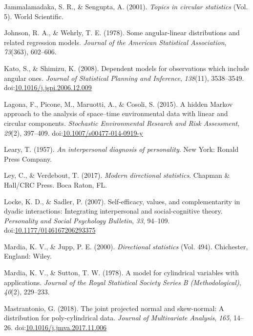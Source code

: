 \documentclass[man,mask]{apa6}
\begin{document}
\leavevmode\hypertarget{ref-jammalamadaka2001topics}{}%
Jammalamadaka, S. R., \& Sengupta, A. (2001). \emph{Topics in circular statistics} (Vol. 5). World Scientific.

\leavevmode\hypertarget{ref-johnson1978some}{}%
Johnson, R. A., \& Wehrly, T. E. (1978). Some angular-linear distributions and related regression models. \emph{Journal of the American Statistical Association}, \emph{73}(363), 602--606.

\leavevmode\hypertarget{ref-kato2008dependent}{}%
Kato, S., \& Shimizu, K. (2008). Dependent models for observations which include angular ones. \emph{Journal of Statistical Planning and Inference}, \emph{138}(11), 3538--3549. doi:\href{https://doi.org/10.1016/j.jspi.2006.12.009}{10.1016/j.jspi.2006.12.009}

\leavevmode\hypertarget{ref-lagona2015hidden}{}%
Lagona, F., Picone, M., Maruotti, A., \& Cosoli, S. (2015). A hidden Markov approach to the analysis of space--time environmental data with linear and circular components. \emph{Stochastic Environmental Research and Risk Assessment}, \emph{29}(2), 397--409. doi:\href{https://doi.org/10.1007/s00477-014-0919-y}{10.1007/s00477-014-0919-y}

\leavevmode\hypertarget{ref-leary1957}{}%
Leary, T. (1957). \emph{An interpersonal diagnosis of personality}. New York: Ronald Press Company.

\leavevmode\hypertarget{ref-ley2017modern}{}%
Ley, C., \& Verdebout, T. (2017). \emph{Modern directional statistics}. Chapman \& Hall/CRC Press. Boca Raton, FL.

\leavevmode\hypertarget{ref-locke2007selfefficacy}{}%
Locke, K. D., \& Sadler, P. (2007). Self-efficacy, values, and complementarity in dyadic interactions: Integrating interpersonal and social-cognitive theory. \emph{Personality and Social Psychology Bulletin}, \emph{33}, 94--109. doi:\href{https://doi.org/10.1177/0146167206293375}{10.1177/0146167206293375}

\leavevmode\hypertarget{ref-mardia2000directional}{}%
Mardia, K. V., \& Jupp, P. E. (2000). \emph{Directional statistics} (Vol. 494). Chichester, England: Wiley.

\leavevmode\hypertarget{ref-mardia1978model}{}%
Mardia, K. V., \& Sutton, T. W. (1978). A model for cylindrical variables with applications. \emph{Journal of the Royal Statistical Society Series B (Methodological)}, \emph{40}(2), 229--233.

\leavevmode\hypertarget{ref-mastrantonio2018joint}{}%
Mastrantonio, G. (2018). The joint projected normal and skew-normal: A distribution for poly-cylindrical data. \emph{Journal of Multivariate Analysis}, \emph{165}, 14--26. doi:\href{https://doi.org/10.1016/j.jmva.2017.11.006}{10.1016/j.jmva.2017.11.006}
\end{document}
